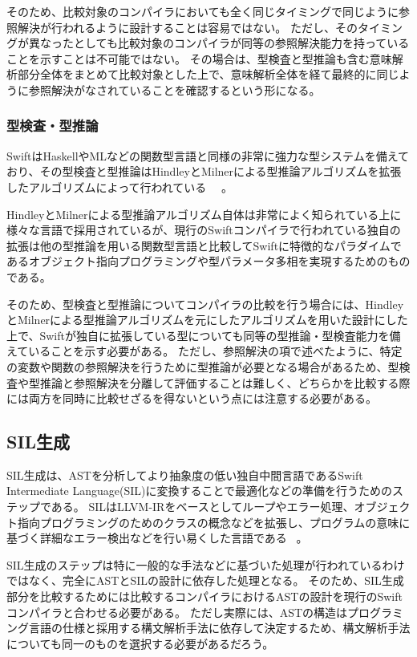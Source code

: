 そのため、比較対象のコンパイラにおいても全く同じタイミングで同じように参照解決が行われるように設計することは容易ではない。
ただし、そのタイミングが異なったとしても比較対象のコンパイラが同等の参照解決能力を持っていることを示すことは不可能ではない。
その場合は、型検査と型推論も含む意味解析部分全体をまとめて比較対象とした上で、意味解析全体を経て最終的に同じように参照解決がなされていることを確認するという形になる。

\subsubsection{型検査・型推論}

SwiftはHaskellやMLなどの関数型言語と同様の非常に強力な型システムを備えており、その型検査と型推論はHindleyとMilnerによる型推論アルゴリズムを拡張したアルゴリズムによって行われている~\cite{swift-type-checker} ~\cite{tapl}。

HindleyとMilnerによる型推論アルゴリズム自体は非常によく知られている上に様々な言語で採用されているが、現行のSwiftコンパイラで行われている独自の拡張は他の型推論を用いる関数型言語と比較してSwiftに特徴的なパラダイムであるオブジェクト指向プログラミングや型パラメータ多相を実現するためのものである。

そのため、型検査と型推論についてコンパイラの比較を行う場合には、HindleyとMilnerによる型推論アルゴリズムを元にしたアルゴリズムを用いた設計にした上で、Swiftが独自に拡張している型についても同等の型推論・型検査能力を備えていることを示す必要がある。
ただし、参照解決の項で述べたように、特定の変数や関数の参照解決を行うために型推論が必要となる場合があるため、型検査や型推論と参照解決を分離して評価することは難しく、どちらかを比較する際には両方を同時に比較せざるを得ないという点には注意する必要がある。

\subsection{SIL生成}

SIL生成は、ASTを分析してより抽象度の低い独自中間言語であるSwift Intermediate Language(SIL)に変換することで最適化などの準備を行うためのステップである。
SILはLLVM-IRをベースとしてループやエラー処理、オブジェクト指向プログラミングのためのクラスの概念などを拡張し、プログラムの意味に基づく詳細なエラー検出などを行い易くした言語である ~\cite{sil}。

SIL生成のステップは特に一般的な手法などに基づいた処理が行われているわけではなく、完全にASTとSILの設計に依存した処理となる。
そのため、SIL生成部分を比較するためには比較するコンパイラにおけるASTの設計を現行のSwiftコンパイラと合わせる必要がある。
ただし実際には、ASTの構造はプログラミング言語の仕様と採用する構文解析手法に依存して決定するため、構文解析手法についても同一のものを選択する必要があるだろう。

